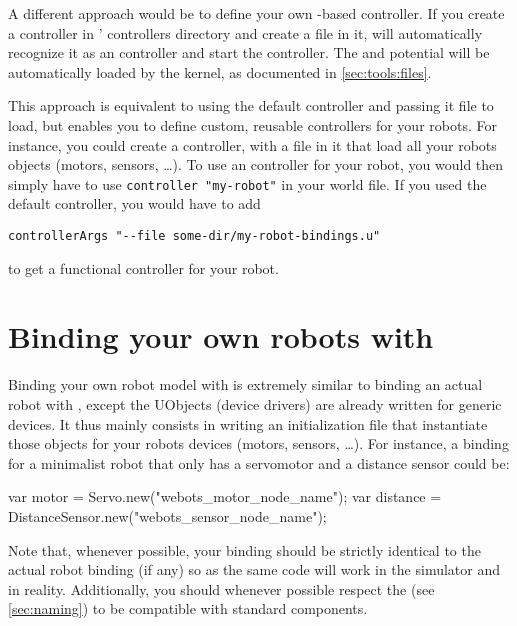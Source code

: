 A different approach would be to define your own \urbi-based
controller. If you create a controller in \webots' controllers
directory and create a  file in it, \webots will
automatically recognize it as an \urbi controller and start the
 controller. The  and potential
 will be automatically loaded by the \urbi kernel, as
documented in \autoref{sec:tools:files}.

This approach is equivalent to using the default 
controller and passing it file to load, but enables you to define
custom, reusable controllers for your robots. For instance, you could
create a  controller, with a
 file in it that load all your robots objects (motors,
sensors, \ldots). To use an \urbi controller for your robot, you would
then simply have to use \lstinline+controller "my-robot"+ in your
world file. If you used the default  controller, you
would have to add

\lstinline+controllerArgs "--file some-dir/my-robot-bindings.u"+

\noindent
to get a functional controller for your robot.

\section{Binding your own robots with \uwebots}

Binding your own robot model with \uwebots is extremely similar to
binding an actual robot with \urbi, except the UObjects (device
drivers) are already written for \webots generic devices. It thus
mainly consists in writing an initialization \us file that instantiate
those \urbi objects for your robots devices (motors, sensors,
\ldots). For instance, a binding for a minimalist robot that only has
a servomotor and a distance sensor could be:

\begin{urbiunchecked}
var motor = Servo.new("webots_motor_node_name");
var distance = DistanceSensor.new("webots_sensor_node_name");
\end{urbiunchecked}

Note that, whenever possible, your \webots binding should be strictly
identical to the actual robot binding (if any) so as the same \urbi
code will work in the simulator and in reality. Additionally, you
should whenever possible respect the \gsrapi (see
\autoref{sec:naming}) to be compatible with standard \urbi components.

